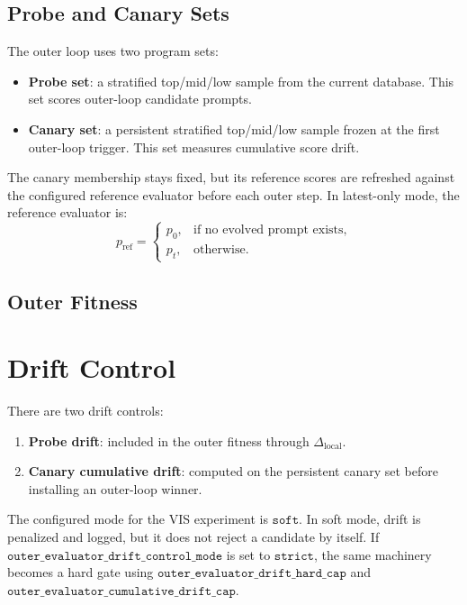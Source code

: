 \documentclass[11pt]{article}
\begin{document}
\subsection{Probe and Canary Sets}

The outer loop uses two program sets:

\begin{itemize}
  \item \textbf{Probe set}: a stratified top/mid/low sample from the current
        database. This set scores outer-loop candidate prompts.
  \item \textbf{Canary set}: a persistent stratified top/mid/low sample frozen
        at the first outer-loop trigger. This set measures cumulative score drift.
\end{itemize}

The canary membership stays fixed, but its reference scores are refreshed against
the configured reference evaluator before each outer step. In latest-only mode,
the reference evaluator is:
\[
  p_{\mathrm{ref}} =
  \begin{cases}
    p_0, & \text{if no evolved prompt exists}, \\
    p_t, & \text{otherwise}.
  \end{cases}
\]

\subsection{Outer Fitness}


\section{Drift Control}

There are two drift controls:

\begin{enumerate}
  \item \textbf{Probe drift}: included in the outer fitness through
        \(\Delta_{\mathrm{local}}\).
  \item \textbf{Canary cumulative drift}: computed on the persistent canary set
        before installing an outer-loop winner.
\end{enumerate}

The configured mode for the VIS experiment is \(\texttt{soft}\). In soft mode,
drift is penalized and logged, but it does not reject a candidate by itself. If
\(\texttt{outer\_evaluator\_drift\_control\_mode}\) is set to \(\texttt{strict}\),
the same machinery becomes a hard gate using
\(\texttt{outer\_evaluator\_drift\_hard\_cap}\) and
\(\texttt{outer\_evaluator\_cumulative\_drift\_cap}\).
\end{document}
